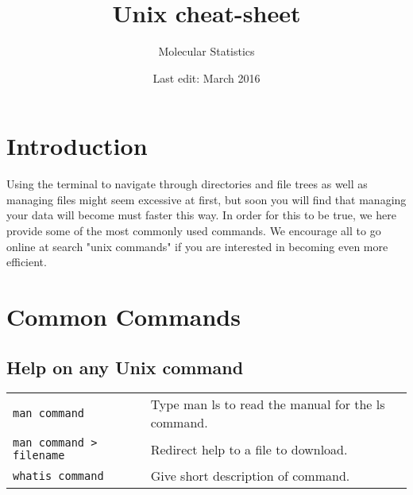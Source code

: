 \documentclass{article}
\title{Unix cheat-sheet}
\author{Molecular Statistics}
\date{Last edit: March 2016}
\begin{document}
\newcommand{\ti}[1]{\texttt{\textit{#1}}}


\maketitle

\section{Introduction}
Using the terminal to navigate through directories and file trees as well as managing files might seem excessive at first, but soon you will find that managing your data will become must faster this way. In order for this to be true, we here provide some of the most commonly used commands. We encourage all to go online at search "unix commands" if you are interested in becoming even more efficient. 

\section{Common Commands}
\subsection{Help on any Unix command}
\begin{table}[h]
\begin{tabular}{ll}
 	\texttt{man {command}} &	Type man ls to read the manual for the ls command. \\
	\texttt{man {command} > {filename}} &	Redirect help to a file to download. \\
	\texttt{whatis {command}} &	Give short description of command.\\
\end{tabular}
\end{table}
\end{document}
